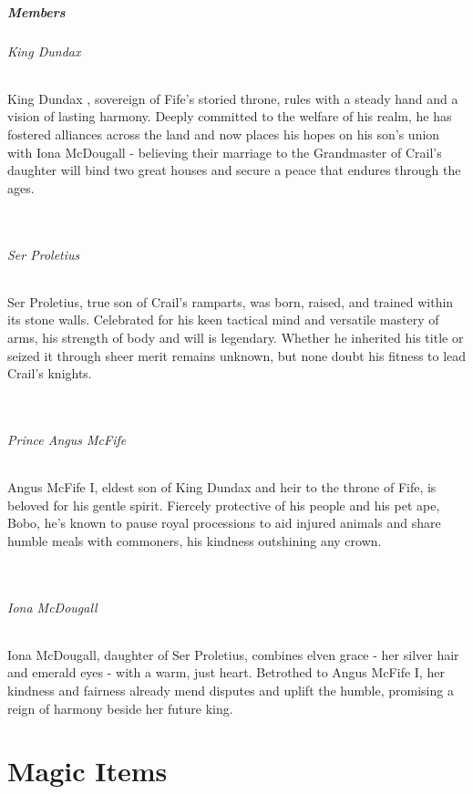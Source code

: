 \documentclass[letterpaper,openany,oneside,twocolumn]{book}
\begin{document}
\subsubsection*{Members}
{\entryfont\paragraph*{King Dundax } King Dundax , sovereign of Fife's storied throne, rules with a steady hand and a vision of lasting harmony. Deeply committed to the welfare of his realm, he has fostered alliances across the land and now places his hopes on his son's union with Iona McDougall - believing their marriage to the Grandmaster of Crail's daughter will bind two great houses and secure a peace that endures through the ages.}\\
{\entryfont\paragraph*{Ser Proletius} Ser Proletius, true son of Crail's ramparts, was born, raised, and trained within its stone walls. Celebrated for his keen tactical mind and versatile mastery of arms, his strength of body and will is legendary. Whether he inherited his title or seized it through sheer merit remains unknown, but none doubt his fitness to lead Crail's knights.}\\
{\entryfont\paragraph*{Prince Angus McFife} Angus McFife I, eldest son of King Dundax  and heir to the throne of Fife, is beloved for his gentle spirit. Fiercely protective of his people and his pet ape, Bobo, he's known to pause royal processions to aid injured animals and share humble meals with commoners, his kindness outshining any crown.}\\
{\entryfont\paragraph*{Iona McDougall} Iona McDougall, daughter of Ser Proletius, combines elven grace - her silver hair and emerald eyes - with a warm, just heart. Betrothed to Angus McFife I, her kindness and fairness already mend disputes and uplift the humble, promising a reign of harmony beside her future king.}

\part*{Magic Items}
\end{document}

